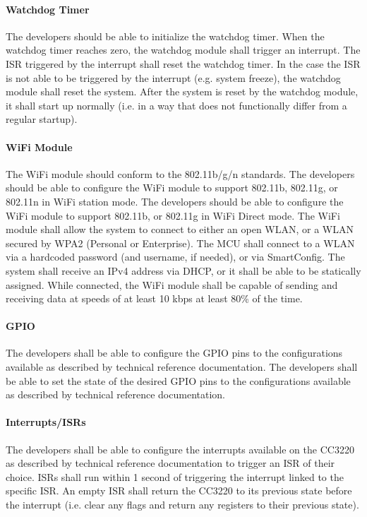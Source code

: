 \paragraph{Watchdog Timer} The developers should be able to initialize the
watchdog timer. When the watchdog timer reaches zero, the watchdog module
shall trigger an interrupt. The ISR triggered by the interrupt shall
reset the watchdog timer. In the case the ISR is not able to be triggered by
the interrupt (e.g. system freeze), the watchdog module shall reset the system.
After the system is reset by the watchdog module, it shall start up normally
(i.e. in a way that does not functionally differ from a regular startup).

\paragraph{WiFi Module} The WiFi module should conform to the 802.11b/g/n
standards. The developers should be able to configure the WiFi
module to support 802.11b, 802.11g, or 802.11n in WiFi station mode.  The 
developers should be able to configure the WiFi module to support 802.11b, or
802.11g in WiFi Direct mode. The WiFi module shall allow the system to
connect to either an open WLAN, or a WLAN secured by WPA2 (Personal or
Enterprise). The MCU shall connect to a WLAN via a hardcoded password (and
username, if needed), or via SmartConfig. The system shall receive an IPv4
address via DHCP, or it shall be able to be statically assigned. While
connected, the WiFi module shall be capable of sending and receiving
data at speeds of at least 10 kbps at least 80\% of the time.

\paragraph{GPIO} The developers shall be able to configure the GPIO pins to
the configurations available as described by technical reference documentation.
The developers shall be able to set the state of the desired GPIO pins to
the configurations available as described by technical reference documentation.

\paragraph{Interrupts/ISRs} The developers shall be able to configure
the interrupts available on the CC3220 as described by technical reference
documentation to trigger an ISR of their choice. ISRs shall run within 1 second
of triggering the interrupt linked to the specific ISR. An empty ISR shall
return the CC3220 to its previous state before the interrupt (i.e. clear any
flags and return any registers to their previous state).

